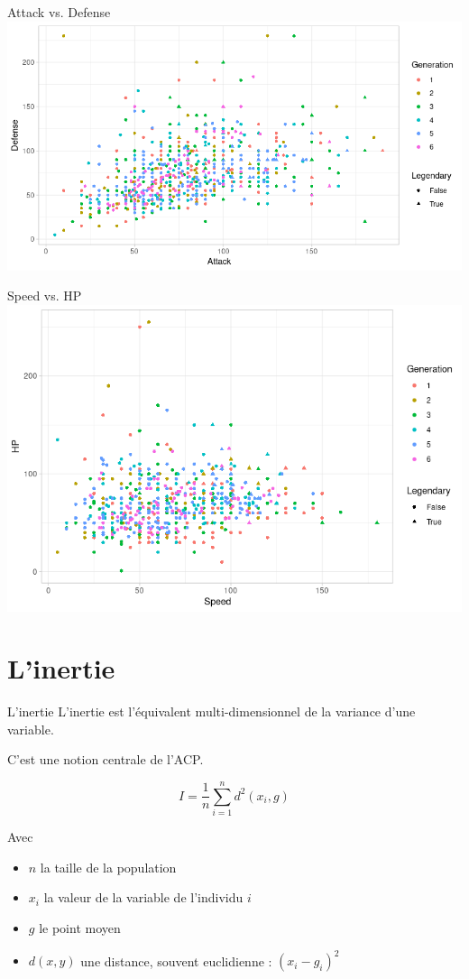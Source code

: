 \documentclass{beamer}
\begin{document}
\begin{frame}{Attack vs. Defense}
\centering
\includegraphics[width=\textwidth,keepaspectratio]{img/Attack_Defense.png}
\end{frame}


\begin{frame}{Speed vs. HP}
\centering
\includegraphics[width=\textwidth,keepaspectratio]{img/Speed_HP.png}
\end{frame}




\section{L'inertie}


\begin{frame}{L'inertie}
L'inertie est l'équivalent \alert{multi-dimensionnel} de la \alert{variance} d'une variable.


C'est une notion centrale de l'ACP.


$$I= \frac{1}{n}\sum_{i=1}^n d^2(x_i,g)$$

Avec 
\begin{itemize}
\item $n$ la taille de la population 
\item $x_i$ la valeur de la variable de l'individu $i$ 
\item $g$ le point moyen 
\item $d(x,y)$ une distance, souvent euclidienne : $(x_i-g_i)^2$ 
\end{itemize}
\end{frame}
\end{document}
